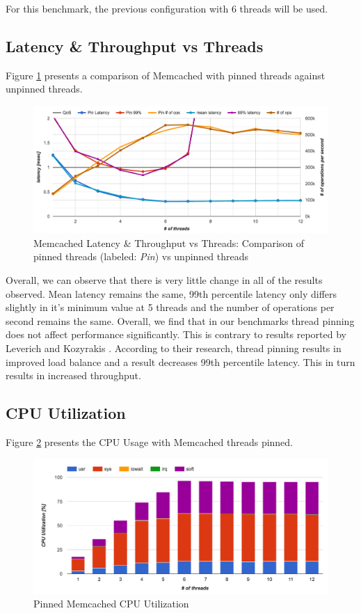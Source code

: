 For this benchmark, the previous configuration with 6 threads will be used.

\subsection{Latency \& Throughput vs Threads}

Figure \ref{fig:m_pinning_latency} presents a comparison of Memcached with pinned threads against unpinned threads.

\begin{figure}[h]
    \includegraphics[width=\textwidth]{./res2/m_pinning_latency.png}
    \caption{Memcached Latency \& Throughput vs Threads: Comparison of pinned threads (labeled: \textit{Pin}) vs unpinned threads}
    \label{fig:m_pinning_latency}
\end{figure}

Overall, we can observe that there is very little change in all of the results observed. Mean latency remains the same, 99th percentile latency only differs slightly in it's minimum value at 5 threads and the number of operations per second remains the same. Overall, we find that in our benchmarks thread pinning does not affect performance significantly. This is contrary to results reported by Leverich and Kozyrakis \cite{leverich2014reconciling}. According to their research, thread pinning results in improved load balance and a result decreases 99th percentile latency. This in turn results in increased throughput.

\subsection{CPU Utilization}

Figure \ref{fig:m_pinning_cpu} presents the CPU Usage with Memcached threads pinned.

\begin{figure}[h]
    \includegraphics[width=\textwidth]{./res2/m_pinning_cpu.png}
    \caption{Pinned Memcached CPU Utilization}
    \label{fig:m_pinning_cpu}
\end{figure}

